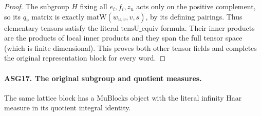 \begin{proof}
The subgroup \(H\) fixing all \(e_i,f_i,z_u\) acts only on
the positive complement, so its \(q_v\) matrix is exactly
\(\mathrm{matW}(w_{u,v},v,s)\), by its defining pairings.
Thus elementary tensors satisfy the literal
\(\mathrm{tensU\_equiv}\) formula.  Their inner products are
the products of local inner products and they span the full tensor
space (which is finite dimensional).  This proves both other tensor
fields and completes the original representation block for every word.
\end{proof}

\paragraph{ASG17. The original subgroup and quotient measures.}
\label{claim:ASG17}
The same lattice block has a \(\mathrm{MuBlocks}\) object with
the literal infinity Haar measure in its quotient integral identity.
